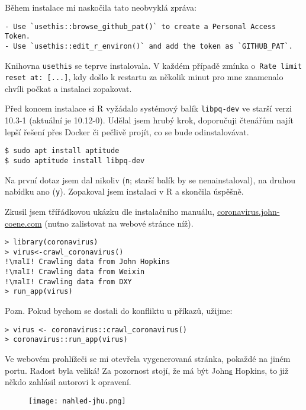 Během instalace mi naskočila tato neobvyklá zpráva:
\begin{lstlisting}
- Use `usethis::browse_github_pat()` to create a Personal Access Token.
- Use `usethis::edit_r_environ()` and add the token as `GITHUB_PAT`.
\end{lstlisting}

Knihovna \texttt{usethis} se teprve instalovala. V každém případě zmínka o~\texttt{Rate limit reset at: [...]}, kdy došlo k restartu za několik minut pro mne znamenalo chvíli počkat a instalaci zopakovat.

Před koncem instalace si R vyžádalo systémový balík \texttt{libpq-dev} ve starší verzi 10.3-1 (aktuální je 10.12-0). Udělal jsem hrubý krok, doporučuji čtenářům najít lepší řešení přes Docker či pečlivě projít, co se bude odinstalovávat.

\begin{lstlisting}
$ sudo apt install aptitude
$ sudo aptitude install libpq-dev
\end{lstlisting}

Na první dotaz jsem dal nikoliv (\texttt{n}; starší balík by se nenainstaloval), na druhou nabídku ano (\texttt{y}). Zopakoval jsem instalaci v R a skončila úspěšně.

Zkusil jsem třířádkovou ukázku dle instalačního manuálu, \href{https://coronavirus.john-coene.com}{\url{coronavirus.john-coene.com}} (nutno zalistovat na webové stránce níž). 

\begin{lstlisting}[escapechar=!]
> library(coronavirus)
> virus<-crawl_coronavirus()
!\malI! Crawling data from John Hopkins
!\malI! Crawling data from Weixin
!\malI! Crawling data from DXY
> run_app(virus)
\end{lstlisting}

Pozn. Pokud bychom se dostali do konfliktu u příkazů, užijme:
\begin{lstlisting}
> virus <- coronavirus::crawl_coronavirus()
> coronavirus::run_app(virus)
\end{lstlisting}

Ve webovém prohlížeči se mi otevřela vygenerovaná stránka, pokaždé na jiném portu. Radost byla veliká! Za pozornost stojí, že má být John\underline{s} Hopkins, to již někdo zahlásil autorovi k opravení.

\begin{figure}[!hbt]
\hfil
\texttt{[image: nahled-jhu.png]}
\end{figure}

